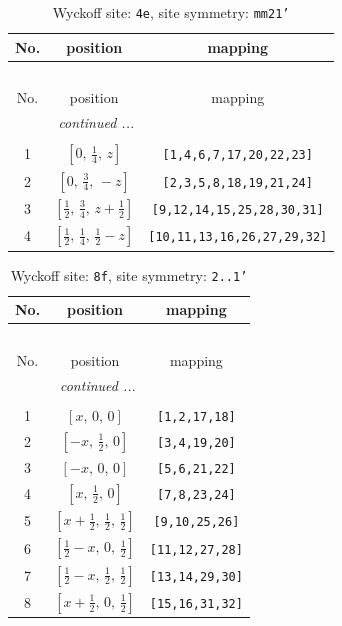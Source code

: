 \documentclass[fleqn,8pt]{jsarticle}
\begin{document}
\renewcommand{\arraystretch}{1.2}
\begin{longtable}{ccc}
\caption{Wyckoff site: {\tt 4e}, site symmetry: {\tt mm21'}}
 \\
 \hline \hline
No. & position & mapping \\ \hline \endfirsthead

\multicolumn{2}{l}{\tablename\ \thetable{}} \\
 \hline \hline
No. & position & mapping \\ \hline \endhead

 \hline \hline
\multicolumn{2}{r}{\footnotesize\it continued ...} \\ \endfoot

 \hline \hline
\multicolumn{2}{r}{} \\ \endlastfoot

1 & $\left[ 0,\, \frac{1}{4},\, z \right]$ & {\tt [1,4,6,7,17,20,22,23]} \\ \hline
2 & $\left[ 0,\, \frac{3}{4},\, - z \right]$ & {\tt [2,3,5,8,18,19,21,24]} \\ \hline
3 & $\left[ \frac{1}{2},\, \frac{3}{4},\, z + \frac{1}{2} \right]$ & {\tt [9,12,14,15,25,28,30,31]} \\ \hline
4 & $\left[ \frac{1}{2},\, \frac{1}{4},\, \frac{1}{2} - z \right]$ & {\tt [10,11,13,16,26,27,29,32]} \\
\end{longtable}
\renewcommand{\arraystretch}{1.2}
\begin{longtable}{ccc}
\caption{Wyckoff site: {\tt 8f}, site symmetry: {\tt 2..1'}}
 \\
 \hline \hline
No. & position & mapping \\ \hline \endfirsthead

\multicolumn{2}{l}{\tablename\ \thetable{}} \\
 \hline \hline
No. & position & mapping \\ \hline \endhead

 \hline \hline
\multicolumn{2}{r}{\footnotesize\it continued ...} \\ \endfoot

 \hline \hline
\multicolumn{2}{r}{} \\ \endlastfoot

1 & $\left[ x,\, 0,\, 0 \right]$ & {\tt [1,2,17,18]} \\ \hline
2 & $\left[ - x,\, \frac{1}{2},\, 0 \right]$ & {\tt [3,4,19,20]} \\ \hline
3 & $\left[ - x,\, 0,\, 0 \right]$ & {\tt [5,6,21,22]} \\ \hline
4 & $\left[ x,\, \frac{1}{2},\, 0 \right]$ & {\tt [7,8,23,24]} \\ \hline
5 & $\left[ x + \frac{1}{2},\, \frac{1}{2},\, \frac{1}{2} \right]$ & {\tt [9,10,25,26]} \\ \hline
6 & $\left[ \frac{1}{2} - x,\, 0,\, \frac{1}{2} \right]$ & {\tt [11,12,27,28]} \\ \hline
7 & $\left[ \frac{1}{2} - x,\, \frac{1}{2},\, \frac{1}{2} \right]$ & {\tt [13,14,29,30]} \\ \hline
8 & $\left[ x + \frac{1}{2},\, 0,\, \frac{1}{2} \right]$ & {\tt [15,16,31,32]} \\
\end{longtable}
\end{document}

